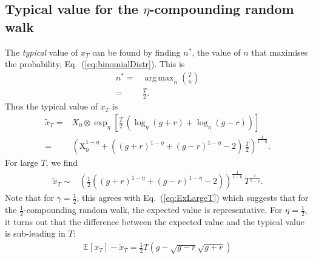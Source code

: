 \documentclass[11pt]{article}
\DeclareMathOperator*{\argmax}{arg\,max}
\begin{document}
\begin{multicols}{2}
\section{Typical value for the $\eta$-compounding random walk}
The {\em typical} value of $x_T$ can be found by finding $n^*$,  the value of $n$ that maximises the probability, Eq.~(\ref{eq:binomialDistr}). This is
\begin{align*}
n^* =& \argmax_{n} {T \choose n}\\
=& \frac{T}{2}.
\end{align*}
Thus the typical value of $x_T$ is
\begin{align}
\nonumber \widetilde{x}_T =& X_0\otimes\exp_\eta\left[ \frac{T}{2}\,\left(\log_\eta(g+r) +\log_\eta(g-r)\right)\right]\\
\label{eq:typicalxT} =&\left(\text{X}_0^{1-\eta} + \left((g+r)^{1-\eta }+(g-r)^{1-\eta }-2\right)\, \frac{T}{2} \right)^\frac{1}{1-\eta}.
\end{align}
For large $T$, we find
\begin{align}
\widetilde{x}_T \sim & \left(\frac{1}{2}  \left((g+r)^{1-\eta }+(g-r)^{1-\eta }-2\right)\right)^\frac{1}{1-\eta} \, T^\frac{1}{1-\eta}.
\end{align}
Note that for $\gamma=\frac{1}{2}$, this agrees with Eq.~(\ref{eq:ExLargeT}) which suggests that for the $\frac{1}{2}$-compounding random walk, the expected value is representative. For $\eta=\frac{1}{2}$, it turns out that the difference between the expected value and the typical value is sub-leading in $T$:
\begin{align}
\label{eq:difference}\mathbb{E}\left[x_T \right] -  \widetilde{x}_T = \frac{1}{2} T \left(g-\sqrt{g-r} \sqrt{g+r}\right)
\end{align}


\end{multicols}
\end{document}
